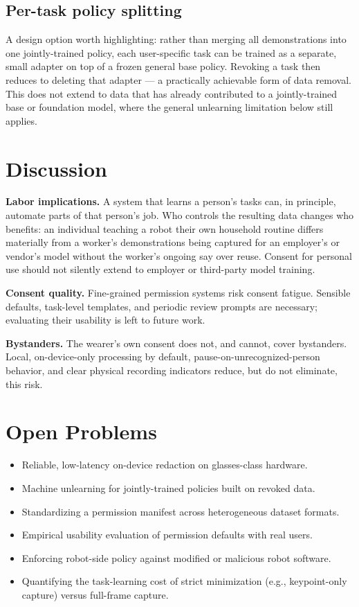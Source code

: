 \documentclass[10pt,twocolumn,letterpaper]{article}
\begin{document}
\subsection{Per-task policy splitting}

A design option worth highlighting: rather than merging all demonstrations into one jointly-trained policy, each user-specific task can be trained as a separate, small adapter on top of a frozen general base policy. Revoking a task then reduces to deleting that adapter — a practically achievable form of data removal. This does not extend to data that has already contributed to a jointly-trained base or foundation model, where the general unlearning limitation below still applies.

\section{Discussion}

\textbf{Labor implications.} A system that learns a person's tasks can, in principle, automate parts of that person's job. Who controls the resulting data changes who benefits: an individual teaching a robot their own household routine differs materially from a worker's demonstrations being captured for an employer's or vendor's model without the worker's ongoing say over reuse. Consent for personal use should not silently extend to employer or third-party model training.

\textbf{Consent quality.} Fine-grained permission systems risk consent fatigue. Sensible defaults, task-level templates, and periodic review prompts are necessary; evaluating their usability is left to future work.

\textbf{Bystanders.} The wearer's own consent does not, and cannot, cover bystanders. Local, on-device-only processing by default, pause-on-unrecognized-person behavior, and clear physical recording indicators reduce, but do not eliminate, this risk.

\section{Open Problems}

\begin{itemize}
  \item Reliable, low-latency on-device redaction on glasses-class hardware.
  \item Machine unlearning for jointly-trained policies built on revoked data.
  \item Standardizing a permission manifest across heterogeneous dataset formats.
  \item Empirical usability evaluation of permission defaults with real users.
  \item Enforcing robot-side policy against modified or malicious robot software.
  \item Quantifying the task-learning cost of strict minimization (e.g., keypoint-only capture) versus full-frame capture.
\end{itemize}
\end{document}
